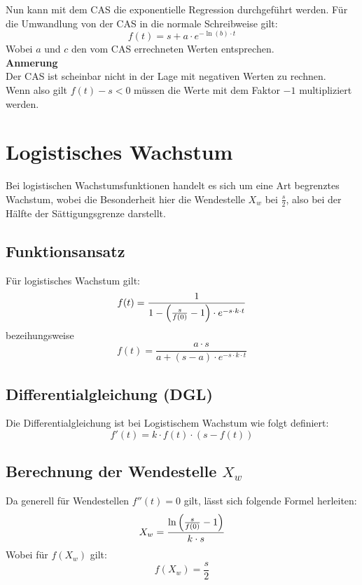 \documentclass[a4paper,12pt]{article}
\begin{document}
\FloatBarrier
Nun kann mit dem CAS die exponentielle Regression durchgeführt werden. Für die Umwandlung von der CAS in die normale Schreibweise gilt:
$$f(t) = s + a \cdot e^{-\ln(b) \cdot t}$$
Wobei $a$ und $c$ den vom CAS errechneten Werten entsprechen.\\
\textbf{Anmerung}\\
Der CAS ist scheinbar nicht in der Lage mit negativen Werten zu rechnen.\\
Wenn also gilt $f(t) - s < 0$ müssen die Werte mit dem Faktor $-1$ multipliziert werden.
\pagebreak


\section{Logistisches Wachstum}
Bei logistischen Wachstumsfunktionen handelt es sich um eine Art begrenztes Wachstum, wobei die Besonderheit hier die Wendestelle $X_w$ bei $\frac{s}{2}$, 
also bei der Hälfte der Sättigungsgrenze darstellt.\\
\subsection{Funktionsansatz}
Für logistisches Wachstum gilt:
$$f(t) = \frac{1}{1-\Big{(}\frac{s}{f(0)} - 1\Big{)} \cdot e^{-s\cdot k \cdot t}}$$
bezeihungsweise
$$f(t) = \frac{a \cdot s}{a + (s - a) \cdot e^{-s \cdot k \cdot t}}$$
\subsection{Differentialgleichung (DGL)}
Die Differentialgleichung ist bei Logistischem Wachstum wie folgt definiert:
$$f'(t) = k \cdot f(t) \cdot (s - f(t))$$
\subsection{Berechnung der Wendestelle $X_w$}
Da generell für Wendestellen $f''(t) = 0$ gilt, lässt sich folgende Formel herleiten:
$$X_w = \frac{\ln{\Big{(}\frac{s}{f(0)} - 1\Big{)}}}{k \cdot s}$$
Wobei für $f(X_w)$ gilt:
$$f(X_w) = \frac{s}{2}$$
\pagebreak
\end{document}
